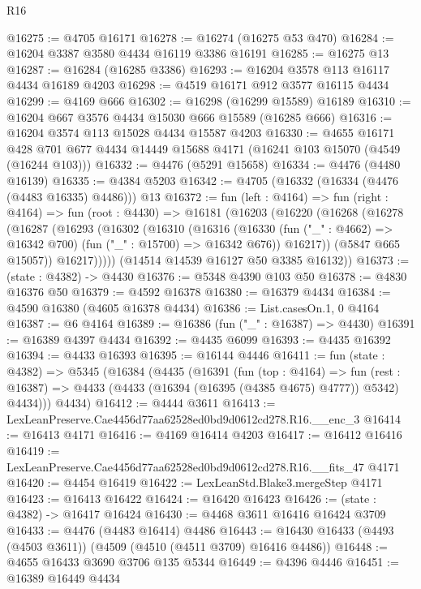 \begin{lexlean}{R16}
\begin{coremodule}
@16275 := @4705 @16171
@16278 := @16274 (@16275 @53 @470)
@16284 := @16204 @3387 @3580 @4434 @16119 @3386 @16191
@16285 := @16275 @13
@16287 := @16284 (@16285 @3386)
@16293 := @16204 @3578 @113 @16117 @4434 @16189 @4203
@16298 := @4519 @16171 @912 @3577 @16115 @4434
@16299 := @4169 @666
@16302 := @16298 (@16299 @15589) @16189
@16310 := @16204 @667 @3576 @4434 @15030 @666 @15589 (@16285 @666)
@16316 := @16204 @3574 @113 @15028 @4434 @15587 @4203
@16330 := @4655
    @16171
    @428
    @701
    @677
    @4434
    @14449
    @15688
    @4171
    (@16241 @103 @15070 (@4549 (@16244 @103)))
@16332 := @4476 (@5291 @15658)
@16334 := @4476 (@4480 @16139)
@16335 := @4384 @5203
@16342 := @4705 (@16332 (@16334 (@4476 (@4483 @16335) @4486))) @13
@16372 := fun (left : @4164) =>
  fun (right : @4164) =>
  fun (root : @4430) =>
  @16181
    (@16203
      (@16220
        (@16268
          (@16278
            (@16287
              (@16293
                (@16302
                  (@16310
                    (@16316
                      (@16330
                        (fun ("_" : @4662) => @16342 @700)
                        (fun ("_" : @15700) => @16342 @676))
                      @16217))
                  (@5847 @665 @15057))
                @16217)))))
      (@14514 @14539 @16127 @50 @3385 @16132))
@16373 := (state : @4382) -> @4430
@16376 := @5348 @4390 @103 @50
@16378 := @4830 @16376 @50
@16379 := @4592 @16378
@16380 := @16379 @4434
@16384 := @4590 @16380 (@4605 @16378 @4434)
@16386 := List.casesOn.{1, 0} @4164
@16387 := @6 @4164
@16389 := @16386 (fun ("_" : @16387) => @4430)
@16391 := @16389 @4397 @4434
@16392 := @4435 @6099
@16393 := @4435 @16392
@16394 := @4433 @16393
@16395 := @16144 @4446
@16411 := fun (state : @4382) =>
  @5345
    (@16384
      (@4435
        (@16391
          (fun (top : @4164) =>
          fun (rest : @16387) => @4433 (@4433 (@16394 (@16395 (@4385 @4675) @4777)) @5342) @4434)))
      @4434)
@16412 := @4444 @3611
@16413 := LexLeanPreserve.Cae4456d77aa62528ed0bd9d0612cd278.R16.__enc_3
@16414 := @16413 @4171
@16416 := @4169 @16414 @4203
@16417 := @16412 @16416
@16419 := LexLeanPreserve.Cae4456d77aa62528ed0bd9d0612cd278.R16.__fits_47 @4171
@16420 := @4454 @16419
@16422 := LexLeanStd.Blake3.mergeStep @4171
@16423 := @16413 @16422
@16424 := @16420 @16423
@16426 := (state : @4382) -> @16417 @16424
@16430 := @4468 @3611 @16416 @16424 @3709
@16433 := @4476 (@4483 @16414) @4486
@16443 := @16430 @16433 (@4493 (@4503 @3611)) (@4509 (@4510 (@4511 @3709) @16416 @4486))
@16448 := @4655 @16433 @3690 @3706 @135 @5344
@16449 := @4396 @4446
@16451 := @16389 @16449 @4434

\end{coremodule}
\end{lexlean}
